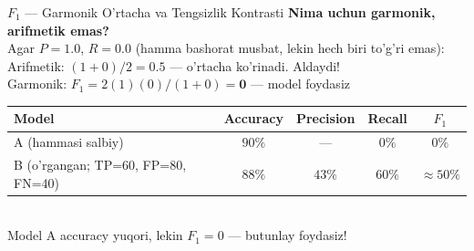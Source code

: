 \documentclass[aspectratio=169,11pt]{beamer}
\begin{document}
\begin{frame}{$F_1$ --- Garmonik O'rtacha va Tengsizlik Kontrasti}
  \small
  \textbf{Nima uchun garmonik, arifmetik emas?}\\[4pt]
  Agar $P{=}1.0$, $R{=}0.0$ (hamma bashorat musbat, lekin hech biri to'g'ri emas):\\
  Arifmetik: $(1+0)/2=0.5$ --- o'rtacha ko'rinadi.\;
  \alert{Aldaydi!}\\
  Garmonik: $F_1=2(1)(0)/(1+0)=\mathbf{0}$ --- model foydasiz \checkmark\\[6pt]
  \begin{tcolorbox}[defbox,title=Ikki model taqqoslash (900 salbiy / 100 musbat)]
    \footnotesize
    \begin{tabular}{@{}lcccc@{}}
      \toprule
      Model & Accuracy & Precision & Recall & $F_1$ \\
      \midrule
      A (hammasi salbiy) &
        $90\%$ & --- & $0\%$ & \textcolor{deepred}{$0\%$} \\
      B (o'rgangan;\; TP=60, FP=80, FN=40) &
        $88\%$ & $43\%$ & $60\%$ &
        \textcolor{deepgreen}{$\approx\!50\%$} \\
      \bottomrule
    \end{tabular}
    \vspace{2pt}\\
    \textcolor{halfgray}{Model A accuracy yuqori,
    lekin $F_1{=}0$ --- butunlay foydasiz!}
  \end{tcolorbox}
\end{frame}
\end{document}

